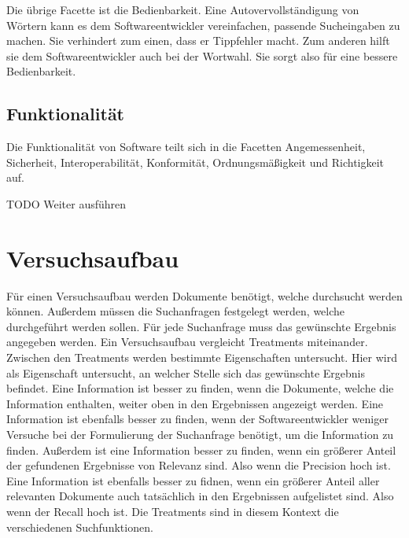 Die übrige Facette ist die Bedienbarkeit.
Eine Autovervollständigung von Wörtern kann es dem Softwareentwickler vereinfachen, passende Sucheingaben zu machen.
Sie verhindert zum einen, dass er Tippfehler macht.
Zum anderen hilft sie dem Softwareentwickler auch bei der Wortwahl.
Sie sorgt also für eine bessere Bedienbarkeit.\\

\subsection{Funktionalität}
Die Funktionalität von Software teilt sich in die Facetten Angemessenheit, Sicherheit, Interoperabilität, Konformität, Ordnungsmäßigkeit und Richtigkeit auf.

TODO Weiter ausführen

\section{Versuchsaufbau}
Für einen Versuchsaufbau werden Dokumente benötigt, welche durchsucht werden können.
Außerdem müssen die Suchanfragen festgelegt werden, welche durchgeführt werden sollen.
Für jede Suchanfrage muss das gewünschte Ergebnis angegeben werden.
Ein Versuchsaufbau vergleicht Treatments miteinander.
Zwischen den Treatments werden bestimmte Eigenschaften untersucht.
Hier wird als Eigenschaft untersucht, an welcher Stelle sich das gewünschte Ergebnis befindet.
Eine Information ist besser zu finden, wenn die Dokumente, welche die Information enthalten, weiter oben in den Ergebnissen angezeigt werden.
Eine Information ist ebenfalls besser zu finden, wenn der Softwareentwickler weniger Versuche bei der Formulierung der Suchanfrage benötigt, um die Information zu finden.
Außerdem ist eine Information besser zu finden, wenn ein größerer Anteil der gefundenen Ergebnisse von Relevanz sind.
Also wenn die Precision hoch ist.
Eine Information ist ebenfalls besser zu fidnen, wenn ein größerer Anteil aller relevanten Dokumente auch tatsächlich in den Ergebnissen aufgelistet sind.
Also wenn der Recall hoch ist.
Die Treatments sind in diesem Kontext die verschiedenen Suchfunktionen.